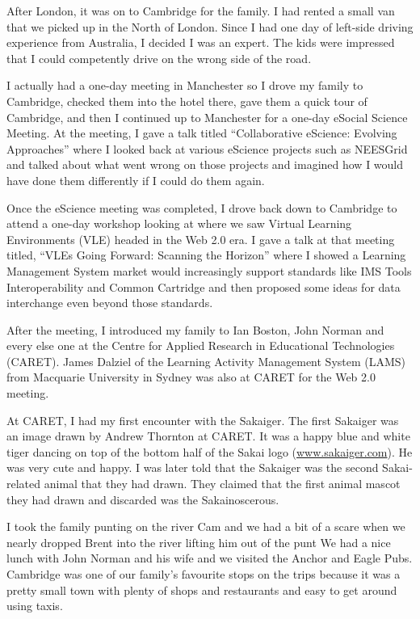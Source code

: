 \documentclass[12pt]{book}
\begin{document}
After London, it was on to Cambridge for the family.  I had rented a small
van that we picked up in the North of London. Since I had one day of
left-side driving experience from Australia, I decided I was an expert.
The kids were impressed that I could competently drive on the wrong side of
the road.

I actually had a one-day meeting in Manchester so I drove my family
to Cambridge, checked them into the hotel there, gave them a
quick tour of Cambridge, and then I continued up to Manchester for
a one-day eSocial Science Meeting.
At the meeting, I gave a talk titled ``Collaborative eScience: Evolving Approaches''
where I looked back at various eScience projects such as
NEESGrid and talked about what went wrong on those projects and
imagined how I would have done them differently if I could do them again.

Once the eScience meeting was completed, I drove back down
to Cambridge to attend a one-day workshop
looking at where we saw Virtual Learning Environments (VLE)
headed in the Web 2.0 era.  I gave a talk at that meeting titled,
``VLEs Going Forward: Scanning the Horizon''
where I showed a Learning Management System market would increasingly
support standards like IMS Tools Interoperability and Common Cartridge
and then proposed some ideas for data interchange even beyond those
standards.

After the meeting, I introduced my family to
Ian Boston, John Norman and every else one at the Centre for Applied
Research in Educational Technologies (CARET).  James Dalziel
of the Learning Activity Management System (LAMS) from Macquarie
University in Sydney was also at CARET for the Web 2.0 meeting.


At CARET, I had my first encounter with the Sakaiger.  The
first Sakaiger was an image drawn by Andrew Thornton at CARET.
It was a happy blue and white tiger dancing on top of the
bottom half of the Sakai logo (\url{www.sakaiger.com}).
He was very cute and happy.  I was later told that
the Sakaiger was the second Sakai-related animal that they had drawn.
They claimed that the first animal mascot they had drawn and discarded
was the Sakainoscerous.  

I took the family punting on the river Cam and we
had a bit of a scare when we nearly dropped Brent into the river
lifting him out of the punt
We had a nice lunch with
John Norman and his wife and we visited the Anchor and Eagle Pubs.
Cambridge was one of our family's favourite stops on the trips because
it was a pretty small town with plenty of shops and restaurants
and easy to get around using taxis.
\end{document}
